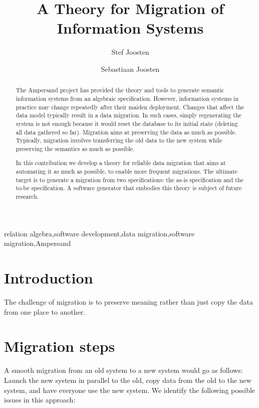 \documentclass{elsarticle}
\begin{document}


\title{A Theory for Migration of Information Systems}
\author[ou,ordina]{Stef Joosten}
\author[umn]{Sebastiaan Joosten}
\address[ou]{Open Universiteit Nederland, Heerlen, the Netherlands}
\address[ordina]{Ordina NV, Nieuwegein, the Netherlands}
\address[umn]{University of Minnesota, Minneapolis, USA}

\begin{abstract}
	The Ampersand project has provided the theory and tools to generate semantic information systems from an algebraic specification.
	However, information systems in practice may change repeatedly after their maiden deployment.
	Changes that affect the data model typically result in a data migration.
	In such cases, simply regenerating the system is not enough because it would reset the database to its initial state (deleting all data gathered so far).
	Migration aims at preserving the data as much as possible.
	Typically, migration involves transferring the old data to the new system while preserving the semantics as much as possible.

	In this contribution we develop a theory for reliable data migration that aims at automating it as much as possible,
	to enable more frequent migrations.
	The ultimate target is to generate a migration from two specifications: the as-is specification and the to-be specification.
	A software generator that embodies this theory is subject of future research.
\end{abstract}

\begin{keyword}
relation algebra\sep software development\sep data migration\sep software migration\sep Ampersand
\end{keyword}
\maketitle

\section{Introduction}
\label{sct:Introduction}
	The challenge of migration is to preserve meaning rather than just copy the data from one place to another.

\section{Migration steps}
	A smooth migration from an old system to a new system would go as follows:
	Launch the new system in parallel to the old, copy data from the old to the new system, and have everyone use the new system.
	We identify the following possible issues in this approach:
\end{document}
